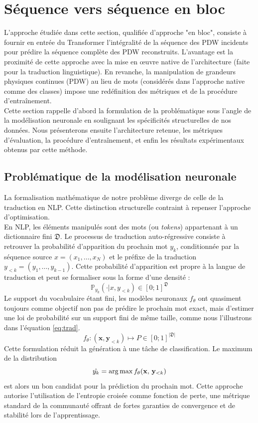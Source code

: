 \section{Séquence vers séquence en bloc}
\label{seq:seq2seqblock}
L'approche étudiée dans cette section, qualifiée d'approche "en bloc", consiste à fournir en entrée du Transformer l'intégralité de la séquence des PDW incidents pour prédire la séquence complète des PDW reconstruits. L'avantage est la proximité de cette approche avec la mise en œuvre native de l'architecture (faite pour la traduction linguistique). En revanche, la manipulation de grandeurs physiques continues (PDW) au lieu de mots (considérés dans l'approche native comme des classes) impose une redéfinition des métriques et de la procédure d'entraînement.\\

Cette section rappelle d'abord la formulation de la problématique sous l'angle de la modélisation neuronale en soulignant les spécificités structurelles de nos données. Nous présenterons ensuite l'architecture retenue, les métriques d'évaluation, la procédure d'entraînement, et enfin les résultats expérimentaux obtenus par cette méthode.

\subsection{Problématique de la modélisation neuronale}
La formalisation mathématique de notre problème diverge de celle de la traduction en NLP. Cette distinction structurelle contraint à repenser l'approche d'optimisation.\\

En NLP, les éléments manipulés sont des mots (ou \textit{tokens}) appartenant à un dictionnaire fini $\mathfrak{D}$. Le processus de traduction auto-régressive consiste à retrouver la probabilité d'apparition du prochain mot $y_k$, conditionnée par la séquence source $x = (x_1, \dots, x_N)$ et le préfixe de la traduction $y_{<k} = (y_1, \dots, y_{k-1})$. Cette probabilité d'apparition est propre à la langue de traduction et peut se formaliser sous la forme d'une densité :
$$\mathbb{P}_{y_k}(\cdot | x, y_{<k}) \in [0; 1]^{\mathfrak{D}}$$
Le support du vocabulaire étant fini, les modèles neuronaux $f_\theta$ ont quasiment toujours comme objectif non pas de prédire le prochain mot exact, mais d'estimer une loi de probabilité sur un support fini de même taille, comme nous l'illustrons dans l'équation \eqref{eq:trad}.
\begin{equation}
\label{eq:trad}
f_{\theta}:(\mathbf{x},\mathbf{y}_{<k})\mapsto P \in [0; 1]^{|\mathfrak{D}|}    
\end{equation}
Cette formulation réduit la génération à une tâche de classification. Le maximum de la distribution $$\hat{y_k} = \operatorname*{arg\,max}{f_{\theta}(\mathbf{x},\,\mathbf{y}_{<k})}$$ est alors un bon candidat pour la prédiction du prochain mot. Cette approche autorise l'utilisation de l'entropie croisée comme fonction de perte, une métrique standard de la communauté offrant de fortes garanties de convergence et de stabilité lors de l'apprentissage.\\

